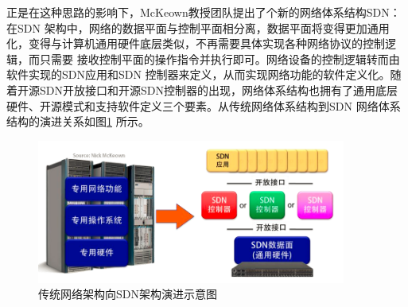 正是在这种思路的影响下，McKeown教授团队提出了个新的网络体系结构SDN\cite{mckeown2008openflow}： 在SDN 架构中，网络的数据平面与控制平面相分离，数据平面将变得更加通用化，变得与计算机通用硬件底层类似，不再需要具体实现各种网络协议的控制逻辑，而只需要 接收控制平面的操作指令并执行即可。网络设备的控制逻辑转而由软件实现的SDN应用和SDN 控制器来定义，从而实现网络功能的软件定义化。随着开源SDN开放接口和开源SDN控制器的出现，网络体系结构也拥有了通用底层硬件、开源模式和支持软件定义三个要素。从传统网络体系结构到SDN 网络体系结构的演进关系如图\ref{fig:SchematicDiagram4EvolutionFromTraditionalNetworkArchitecture2SDNArchitecture} 所示。
\begin{figure}[htbp]
\centering
\includegraphics[width=4.0in]{figures/SchematicDiagram4EvolutionFromTraditionalNetworkArchitecture2SDNArchitecture}
  \caption{传统网络架构向SDN架构演进示意图}
  \label{fig:SchematicDiagram4EvolutionFromTraditionalNetworkArchitecture2SDNArchitecture}
\end{figure}



%

